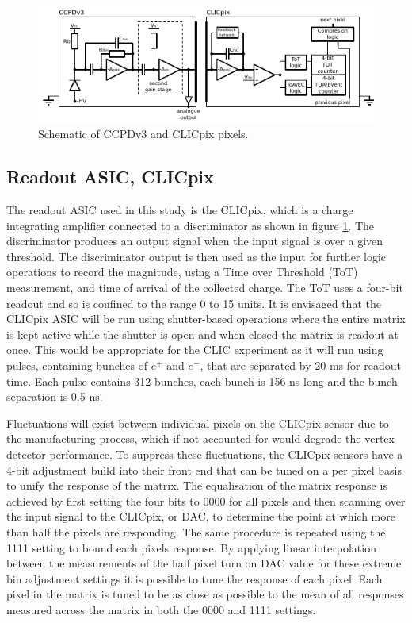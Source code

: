 \begin{figure}
\centering
\includegraphics[width=1.0\textwidth]{CLICdpVertex/Plots/schematic.pdf}
\caption[Schematic of CCPDv3 and CLICpix pixels.]{Schematic of CCPDv3 and CLICpix pixels.}
\label{fig:ccpdandclicpix}
\end{figure}


\subsection{Readout ASIC, CLICpix}
The readout ASIC used in this study is the CLICpix, which is a charge integrating amplifier connected to a discriminator as shown in figure \ref{fig:ccpdandclicpix}.  The discriminator produces an output signal when the input signal is over a given threshold.  The discriminator output is then used as the input for further logic operations to record the magnitude, using a Time over Threshold (ToT) measurement, and time of arrival of the collected charge.  The ToT uses a four-bit readout and so is confined to the range 0 to 15 units.  It is envisaged that the CLICpix ASIC will be run using shutter-based operations where the entire matrix is kept active while the shutter is open and when closed the matrix is readout at once.  This would be appropriate for the CLIC experiment as it will run using pulses, containing bunches of $e^{+}$ and $e^{-}$, that are separated by 20 ms for readout time.  Each pulse contains 312 bunches, each bunch is 156 ns long and the bunch separation is 0.5 ns.  

Fluctuations will exist between individual pixels on the CLICpix sensor due to the manufacturing process, which if not accounted for would degrade the vertex detector performance.  To suppress these fluctuations, the CLICpix sensors have a 4-bit adjustment build into their front end that can be tuned on a per pixel basis to unify the response of the matrix.  The equalisation of the matrix response is achieved by first setting the four bits to 0000 for all pixels and then scanning over the input signal to the CLICpix, or DAC, to determine the point at which more than half the pixels are responding.  The same procedure is repeated using the 1111 setting to bound each pixels response.  By applying linear interpolation between the measurements of the half pixel turn on DAC value for these extreme bin adjustment settings it is possible to tune the response of each pixel.  Each pixel in the matrix is tuned to be as close as possible to the mean of all responses measured across the matrix in both the 0000 and 1111 settings.  

